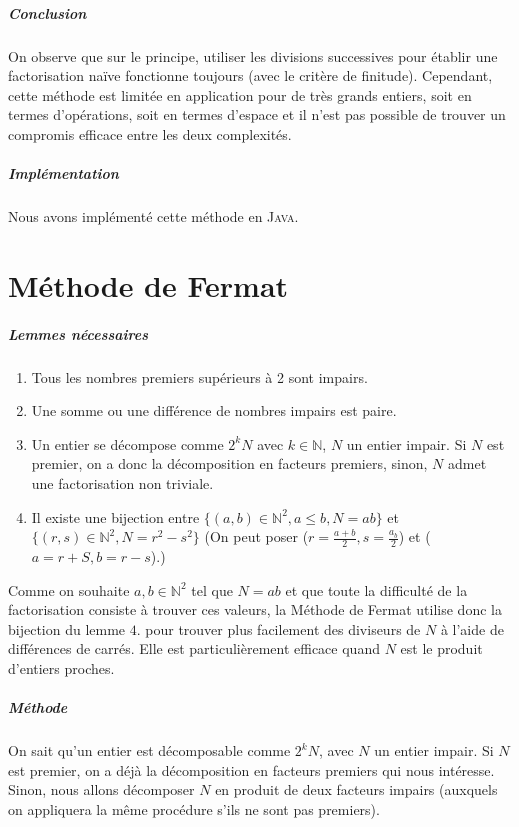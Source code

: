 \documentclass[11pt,a4paper]{article}
\begin{document}
	\subparagraph{Conclusion}
	
	On observe que sur le principe, utiliser les divisions successives pour établir une factorisation naïve fonctionne toujours (avec le critère de finitude). Cependant, cette méthode est limitée en application pour de très grands entiers, soit en termes d'opérations, soit en termes d'espace et il n'est pas possible de trouver un compromis efficace entre les deux complexités.
	
	\subparagraph{Implémentation}
	Nous avons implémenté cette méthode en \textsc{Java}.	
	\newpage
	
	\section{\LARGE{Méthode de Fermat}}
	
	\subparagraph{Lemmes nécessaires}
	\begin{enumerate}
		\item Tous les nombres premiers supérieurs à 2 sont impairs.
		
		\item Une somme ou une différence de nombres impairs est paire.
		
		\item Un entier se décompose comme $2^{k}N$ avec $k \in \mathbb{N}$, $N$ un entier impair. Si $N$ est premier, on a donc la décomposition en facteurs premiers, sinon, $N$ admet une factorisation non triviale.
		
		\item Il existe une bijection entre ${\{(a,b) \in \mathbb{N}^2, a \leq b, N = ab\}}$ et $\{(r,s) \in \mathbb{N}^2, N = r^2 - s^2\}$ 
		(On peut poser ($r = \frac{a+b}{2}, s = \frac{a_b}{2}$) et ($a=r+S , b = r-s$).)
	\end{enumerate}
	
	Comme on souhaite $a,b \in \mathbb{N}^2$ tel que $N = ab$ et que toute la difficulté de la factorisation consiste à trouver ces valeurs, la Méthode de Fermat utilise donc la bijection du lemme $4.$ pour trouver plus facilement des diviseurs de $N$ à l'aide de différences de carrés. Elle est particulièrement efficace quand $N$ est le produit d'entiers proches.
	
	\subparagraph{Méthode}
	On sait qu'un entier est décomposable comme $2^{k}N$, avec $N$ un entier impair. Si $N$ est premier, on a déjà la décomposition en facteurs premiers qui nous intéresse. Sinon, nous allons décomposer $N$ en produit de deux facteurs impairs (auxquels on appliquera la même procédure s'ils ne sont pas premiers). 
	
\end{document}
